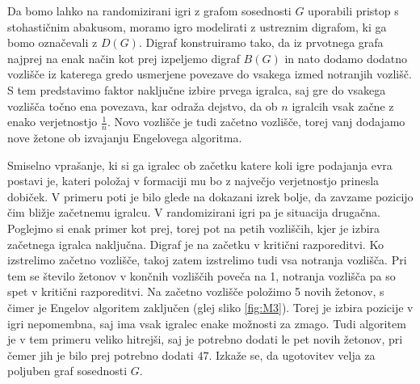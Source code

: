\documentclass[twoside,11pt]{article}
\begin{document}
Da bomo lahko na randomizirani igri z grafom sosednosti $G$ uporabili pristop s stohastičnim abakusom, moramo igro modelirati z ustreznim digrafom, ki ga bomo označevali z $D(G)$.
Digraf konstruiramo tako, da iz prvotnega grafa najprej na enak način kot prej izpeljemo digraf $B(G)$ in nato dodamo dodatno vozlišče iz katerega gredo usmerjene povezave do vsakega izmed notranjih vozlišč. 
S tem predstavimo faktor naključne izbire prvega igralca, saj gre do vsakega vozlišča točno ena povezava, kar odraža dejstvo, da ob $n$ 
igralcih vsak začne z enako verjetnostjo $\frac{1}{n}$. Novo vozlišče je tudi začetno vozlišče, torej vanj dodajamo nove žetone ob izvajanju Engelovega algoritma.

Smiselno vprašanje, ki si ga igralec ob začetku katere koli igre podajanja evra postavi je, kateri položaj v formaciji mu bo z največjo verjetnostjo prinesla dobiček. V primeru poti je bilo glede na dokazani izrek bolje, da zavzame pozicijo čim bližje začetnemu igralcu.
V randomizirani igri pa je situacija drugačna. Poglejmo si enak primer kot prej, torej pot na petih vozliščih, kjer je izbira začetnega igralca naključna. Digraf je na začetku v kritični razporeditvi.
Ko izstrelimo začetno vozlišče, takoj zatem izstrelimo tudi vsa notranja vozlišča. Pri tem se število žetonov v končnih vozliščih poveča na 1, notranja vozlišča pa so spet v kritični razporeditvi. Na začetno vozlišče položimo 5 novih žetonov, s čimer je Engelov algoritem zaključen (glej sliko \ref{fig:M3}).
Torej je izbira pozicije v igri nepomembna, saj ima vsak igralec enake možnosti za zmago. Tudi algoritem je v tem primeru veliko hitrejši, saj je potrebno dodati le pet novih žetonov, pri čemer jih je bilo prej potrebno dodati $47$. Izkaže se, da ugotovitev velja za poljuben graf sosednosti $G$.
\end{document}
